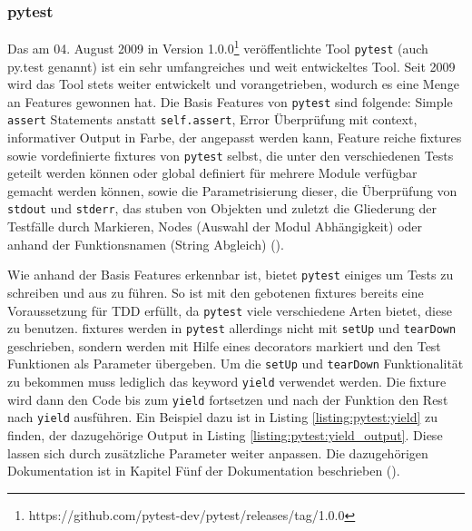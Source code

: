 \subsubsection{pytest}\label{python-tools:pytest}\mbox{}
\newline
Das am 04. August 2009 in Version
1.0.0\footnote{https://github.com/pytest-dev/pytest/releases/tag/1.0.0}
veröffentlichte Tool \lstinline{pytest} (auch py.test genannt)
ist ein sehr umfangreiches und weit entwickeltes Tool. Seit 2009 wird das Tool
stets weiter entwickelt und vorangetrieben, wodurch es eine Menge an Features
gewonnen hat.
\noindent
Die Basis Features von \lstinline{pytest} sind folgende:
Simple \lstinline{assert} Statements anstatt \lstinline{self.assert}, Error
Überprüfung mit \Gls{context}, informativer Output in Farbe, der angepasst
werden kann, Feature reiche \Glspl{fixture} sowie vordefinierte \Glspl{fixture}
von \lstinline{pytest} selbst, die unter den verschiedenen Tests geteilt werden
können oder global definiert für mehrere Module verfügbar gemacht werden
können, sowie die Parametrisierung dieser, die Überprüfung von
\lstinline{stdout} und \lstinline{stderr}, das \gls{stub}en von Objekten und
zuletzt die Gliederung der Testfälle durch Markieren, Nodes (Auswahl der Modul
Abhängigkeit) oder anhand der Funktionsnamen (String Abgleich)
(\cite{docs.pytest.org:4.4}).
\newline

Wie anhand der Basis Features erkennbar ist, bietet \lstinline{pytest} einiges
um Tests zu schreiben und aus zu führen. So ist mit den gebotenen
\Glspl{fixture} bereits eine Voraussetzung für TDD erfüllt, da
\lstinline{pytest} viele verschiedene Arten bietet, diese zu benutzen.
\Glspl{fixture} werden in \lstinline{pytest} allerdings nicht mit
\lstinline{setUp} und \lstinline{tearDown} geschrieben, sondern werden mit Hilfe
eines \glspl{decorator} markiert und den Test Funktionen als Parameter
übergeben. Um die \lstinline{setUp} und \lstinline{tearDown} Funktionalität zu
bekommen muss lediglich das keyword \lstinline{yield} verwendet werden. Die
\Gls{fixture} wird dann den Code bis zum \lstinline{yield} fortsetzen und nach
der Funktion den Rest nach \lstinline{yield} ausführen. Ein Beispiel dazu ist in
Listing \ref{listing:pytest:yield} zu finden, der dazugehörige Output in
Listing \ref{listing:pytest:yield_output}. Diese lassen sich durch zusätzliche
Parameter weiter anpassen. Die dazugehörigen Dokumentation ist in Kapitel Fünf
der Dokumentation beschrieben (\cite{docs.pytest.org:4.4}).
\newline

